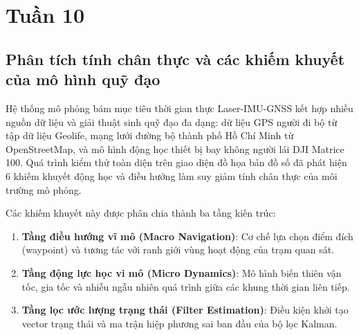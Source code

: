 \section{Tuần 10}

\subsection{Phân tích tính chân thực và các khiếm khuyết của mô hình quỹ đạo}

\hspace{0.5cm} Hệ thống mô phỏng bám mục tiêu thời gian thực Laser-IMU-GNSS kết hợp nhiều nguồn dữ liệu và giải thuật sinh quỹ đạo đa dạng: dữ liệu GPS người đi bộ từ tập dữ liệu Geolife, mạng lưới đường bộ thành phố Hồ Chí Minh từ OpenStreetMap, và mô hình động học thiết bị bay không người lái DJI Matrice 100. Quá trình kiểm thử toàn diện trên giao diện đồ họa bản đồ số đã phát hiện 6 khiếm khuyết động học và điều hướng làm suy giảm tính chân thực của môi trường mô phỏng.

Các khiếm khuyết này được phân chia thành ba tầng kiến trúc:
\begin{enumerate}
    \item \textbf{Tầng điều hướng vĩ mô (Macro Navigation)}: Cơ chế lựa chọn điểm đích (waypoint) và tương tác với ranh giới vùng hoạt động của trạm quan sát.
    \item \textbf{Tầng động lực học vi mô (Micro Dynamics)}: Mô hình biến thiên vận tốc, gia tốc và nhiễu ngẫu nhiên quá trình giữa các khung thời gian liên tiếp.
    \item \textbf{Tầng lọc ước lượng trạng thái (Filter Estimation)}: Điều kiện khởi tạo vector trạng thái và ma trận hiệp phương sai ban đầu của bộ lọc Kalman.
\end{enumerate}

\begin{table}[H]
\centering
\caption{Phân loại hệ thống 6 khiếm khuyết tính chân thực quỹ đạo và giải pháp xử lý}
\label{tab:six-realism-issues-taxonomy}
\end{table}

